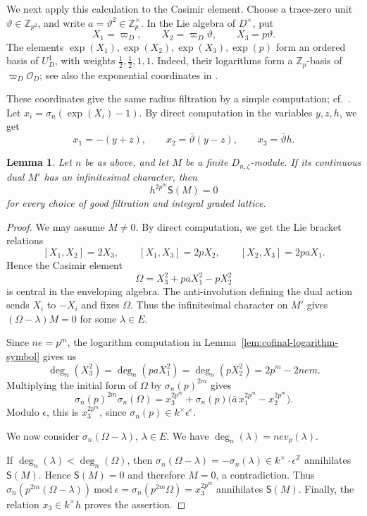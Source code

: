 \documentclass[11pt]{article}
\newtheorem{lemma}[theorem]{Lemma}
\theoremstyle{definition}
\newcommand{\cO}{\mathcal O}
\begin{document}
We next apply this calculation to the Casimir element.
Choose a trace-zero unit $\vartheta\in\mathbb Z_{p^2}$, and write
$a=\vartheta^2\in\mathbb Z_p^\times$. In the Lie algebra of $D^\times$,
put
\[
 X_1=\varpi_D,\qquad X_2=\varpi_D\vartheta,\qquad X_3=p\vartheta.
\]
The elements $\exp(X_1),\exp(X_2),\exp(X_3),\exp(p)$ form an
ordered basis of $U_D^1$, with weights $\tfrac12,\tfrac12,1,1$.
Indeed, their logarithms form a $\mathbb Z_p$-basis of
$\varpi_D\cO_D$; see also the exponential coordinates in
\cite[\S6.5]{Sorgdrager2026}.

These coordinates give the same radius filtration by a simple computation; cf.\ \cite[Lemma~4.1]{ST03}.
Let $x_i=\sigma_n(\exp(X_i)-1)$. By direct computation in the variables $y, z, h$, we get  
\[x_1=-(y+z), \qquad x_2=\bar \vartheta(y-z), \qquad x_3=\bar\vartheta h.\]

\begin{lemma}\label{lem:casimir-h-nilpotence}
Let $n$ be as above, and let $M$ be a finite $D_{n,\zeta}$-module.
If its continuous dual $M'$ has an infinitesimal character, then
\[
 h^{2p^m}\mathsf S(M)=0
\]
for every choice of good filtration and integral graded lattice.
\end{lemma}
\begin{proof}
We may assume $M\ne0$. By direct computation, we get the Lie bracket relations
\[
 [X_1,X_2]=2X_3,\qquad
 [X_1,X_3]=2pX_2,\qquad
 [X_2,X_3]=2paX_1.
\]
Hence the Casimir element
\[
 \Omega=X_3^2+paX_1^2-pX_2^2
\]
is central in the enveloping algebra. The anti-involution defining
the dual action sends $X_i$ to $-X_i$ and fixes $\Omega$.
Thus the infinitesimal character on $M'$ gives
$(\Omega-\lambda)M=0$ for some $\lambda\in E$.

Since $ne=p^m$, the logarithm computation in Lemma~\ref{lem:cofinal-logarithm-symbol} gives us
\[
 \deg_n(X_3^2)=\deg_n(paX_1^2)=\deg_n(pX_2^2)
 =2p^m-2ne m.
\]
Multiplying the initial form of $\Omega$ by $\sigma_n(p)^{2m}$ gives
\[
 \sigma_n(p)^{2m}\sigma_n(\Omega)
 =x_3^{2p^m}+\sigma_n(p)
       \bigl(\bar a\,x_1^{2p^m}-x_2^{2p^m}\bigr).
\]
Modulo $\epsilon$, this is $x_3^{2p^m}$, since
$\sigma_n(p)\in k^\times\epsilon^e$.

We now consider $\sigma_n(\Omega-\lambda)$, $\lambda\in E$.
We have $\deg_n(\lambda)=nev_p(\lambda)$.

If $\deg_n(\lambda)<\deg_n(\Omega)$,
then $\sigma_n(\Omega-\lambda)=-\sigma_n(\lambda)\in k^\times\cdot\epsilon^{\mathbb{Z}}$ annihilates $\mathsf{S}(M)$.
Hence $\mathsf{S}(M)=0$ and therefore $M=0$, a contradiction.
Thus $\sigma_n(p^{2m}(\Omega-\lambda))\ \mathrm{mod}\ \epsilon=\sigma_n(p^{2m}\Omega)=x_3^{2p^m}$ annihilates $\mathsf{S}(M)$.
Finally, the relation $x_3\in k^\times h$ proves the assertion.
\end{proof}
\end{document}
